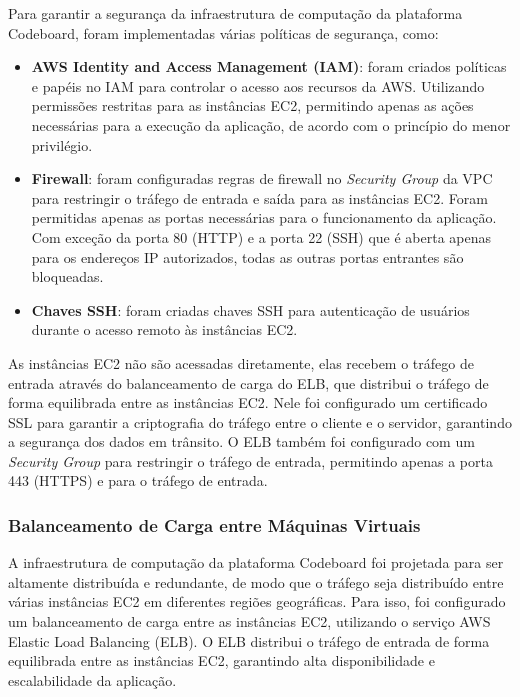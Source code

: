 Para garantir a segurança da infraestrutura de computação da plataforma Codeboard, foram implementadas várias políticas de segurança, como:

\begin{itemize}
    \item \textbf{AWS Identity and Access Management (IAM)}: foram criados políticas e papéis no IAM para controlar o acesso aos recursos da AWS. Utilizando permissões restritas para as instâncias EC2, permitindo apenas as ações necessárias para a execução da aplicação, de acordo com o princípio do menor privilégio. %
    \item \textbf{Firewall}: foram configuradas regras de firewall no \emph{Security Group} da VPC para restringir o tráfego de entrada e saída para as instâncias EC2. Foram permitidas apenas as portas necessárias para o funcionamento da aplicação. Com exceção da porta 80 (HTTP) e a porta 22 (SSH) que é aberta apenas para os endereços IP autorizados, todas as outras portas entrantes são bloqueadas.
    \item \textbf{Chaves SSH}: foram criadas chaves SSH para autenticação de usuários durante o acesso remoto às instâncias EC2. 
\end{itemize}

As instâncias EC2 não são acessadas diretamente, elas recebem o tráfego de entrada através do balanceamento de carga do ELB, que distribui o tráfego de forma equilibrada entre as instâncias EC2. Nele foi configurado um certificado SSL para garantir a criptografia do tráfego entre o cliente e o servidor, garantindo a segurança dos dados em trânsito. O ELB também foi configurado com um \emph{Security Group} para restringir o tráfego de entrada, permitindo apenas a porta 443 (HTTPS) e para o tráfego de entrada.

\subsubsection{Balanceamento de Carga entre Máquinas Virtuais}

A infraestrutura de computação da plataforma Codeboard foi projetada para ser altamente distribuída e redundante, de modo que o tráfego seja distribuído entre várias instâncias EC2 em diferentes regiões geográficas. Para isso, foi configurado um balanceamento de carga entre as instâncias EC2, utilizando o serviço AWS Elastic Load Balancing (ELB). O ELB distribui o tráfego de entrada de forma equilibrada entre as instâncias EC2, garantindo alta disponibilidade e escalabilidade da aplicação.

